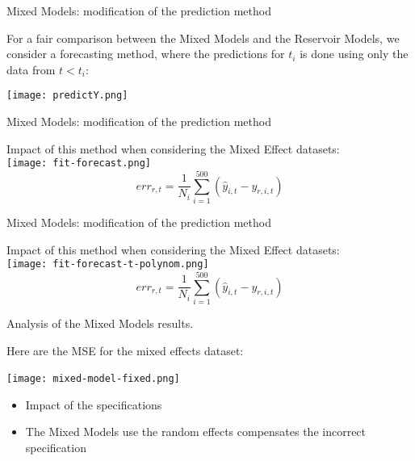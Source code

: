 \documentclass{beamer}
\begin{document}
\begin{frame}{Mixed Models: modification of the prediction method}


For a fair comparison between the Mixed Models and the Reservoir Models, we consider a forecasting method, where the predictions for $t_i$ is done using only the data from $t<t_i$:

\medskip
\centering
\texttt{[image: predictY.png]}
\medskip


\end{frame}


\begin{frame}{Mixed Models: modification of the prediction method}


Impact of this method when considering the Mixed Effect datasets: \\

\centering
\texttt{[image: fit-forecast.png]}
\tiny{$$ err_{r, t} = \frac{1}{N_{i}} \sum_{i=1}^{500} (\hat{y}_{i,t} - y_{r,i,t}) $$}


\end{frame}


\begin{frame}{Mixed Models: modification of the prediction method}


Impact of this method when considering the Mixed Effect datasets: \\

\centering
\texttt{[image: fit-forecast-t-polynom.png]}
\tiny{$$ err_{r, t} = \frac{1}{N_{i}} \sum_{i=1}^{500} (\hat{y}_{i,t} - y_{r,i,t}) $$}

\end{frame}




\begin{frame}{Analysis of the Mixed Models results.}

Here are the MSE for the mixed effects dataset:
\medskip

\centering
\texttt{[image: mixed-model-fixed.png]}
\

\medskip

\begin{itemize}
	\item Impact of the specifications\\
	\item The Mixed Models use the random effects compensates the incorrect specification
\end{itemize}

\end{frame}
\end{document}
